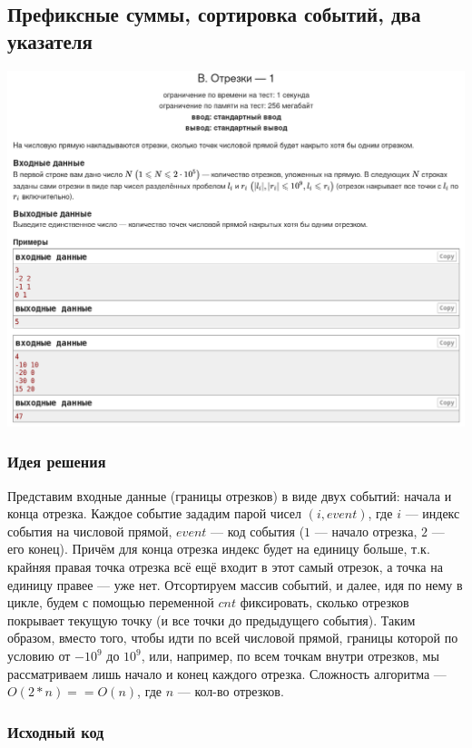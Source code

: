 \subsection*{Префиксные суммы, сортировка событий, два указателя}
\begin{center}
\includegraphics[width=\textwidth]{statements/20220704/B.png}
\end{center}
\subsubsection*{Идея решения}

Представим входные данные (границы отрезков) в виде двух событий: начала и конца отрезка. Каждое событие зададим парой чисел $(i, event)$, где $i$ --- индекс события на числовой прямой, $event$ --- код события ($1$ --- начало отрезка, $2$ --- его конец). Причём для конца отрезка индекс будет на единицу больше, т.к. крайняя правая точка отрезка всё ещё входит в этот самый отрезок, а точка на единицу правее --- уже нет. Отсортируем массив событий, и далее, идя по нему в цикле, будем с помощью переменной $cnt$ фиксировать, сколько отрезков покрывает текущую точку (и все точки до предыдущего события). Таким образом, вместо того, чтобы идти по всей числовой прямой, границы которой по условию от $-10^9$ до $10^9$, или, например, по всем точкам внутри отрезков, мы рассматриваем лишь начало и конец каждого отрезка. Сложность алгоритма --- $O(2*n) == O(n)$, где $n$ --- кол-во отрезков.

\subsubsection*{Исходный код}


